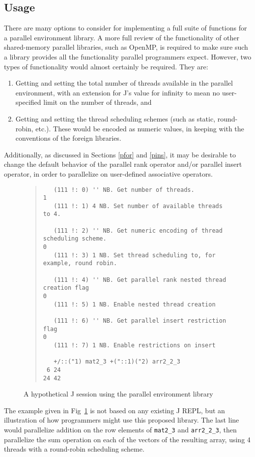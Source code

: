 \subsection{Usage}
There are many options to consider for implementing a full suite of functions for a parallel environment library.
A more full review of the functionality of other shared-memory parallel libraries, such as OpenMP\cite{openmp}, 
is required to make sure such a library provides all the functionality parallel programmers expect.
However, two types of functionality would almost certainly be required.
They are:

\begin{enumerate}
    \item Getting and setting the total number of threads available in the parallel environment,
        with an extension for J's value for infinity to mean no user-specified limit on the number of threads, and
    \item Getting and setting the thread scheduling schemes (such as static, round-robin, etc.).
        These would be encoded as numeric values, in keeping with the conventions of the foreign libraries.
\end{enumerate}

\noindent Additionally, as discussed in Sections \ref{pfor} and \ref{pins}, it may be desirable to change 
the default behavior of the parallel rank operator and/or parallel insert operator, 
in order to parallelize on user-defined associative operators.

\begin{figure}
\begin{quote}
\begin{singlespacing}
\begin{small}
\begin{verbatim}
   (111 !: 0) '' NB. Get number of threads.
1
   (111 !: 1) 4 NB. Set number of available threads to 4.

   (111 !: 2) '' NB. Get numeric encoding of thread scheduling scheme.
0
   (111 !: 3) 1 NB. Set thread scheduling to, for example, round robin.

   (111 !: 4) '' NB. Get parallel rank nested thread creation flag
0
   (111 !: 5) 1 NB. Enable nested thread creation

   (111 !: 6) '' NB. Get parallel insert restriction flag
0
   (111 !: 7) 1 NB. Enable restrictions on insert

   +/::("1) mat2_3 +("::1)("2) arr2_2_3
 6 24
24 42
\end{verbatim}
\end{small}
\end{singlespacing}
\end{quote}
\caption{A hypothetical J session using the parallel environment library}
\label{fig::pfor}
\end{figure}

The example given in Fig~\ref{fig::pfor} is not based on any existing J REPL, 
but an illustration of how programmers might use this proposed library.
The last line would parallelize addition on the row elements of \texttt{mat2\_3} and \texttt{arr2\_2\_3},
then parallelize the sum operation on each of the vectors of the resulting array, 
using 4 threads with a round-robin scheduling scheme.
